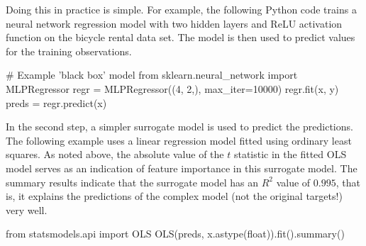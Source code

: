 Doing this in practice is simple. For example, the following Python code trains a neural network regression model with two hidden layers and ReLU activation function on the bicycle rental data set. The model is then used to predict values for the training observations.

\begin{samepage}
\begin{pythoncode}
# Example 'black box' model
from sklearn.neural_network import MLPRegressor
regr = MLPRegressor((4, 2,), max_iter=10000)
regr.fit(x, y)
preds = regr.predict(x)
\end{pythoncode}
\end{samepage}

In the second step, a simpler surrogate model is used to predict the predictions. The following example uses a linear regression model fitted using ordinary least squares. As noted above, the absolute value of the $t$ statistic in the fitted OLS model serves as an indication of feature importance in this surrogate model. The summary results indicate that the surrogate model has an $R^2$ value of $0.995$, that is, it explains the predictions of the complex model (not the original targets!) very well. 

\begin{samepage}
\begin{pythoncode}
from statsmodels.api import OLS
OLS(preds, x.astype(float)).fit().summary()
\end{pythoncode}
\end{samepage}


